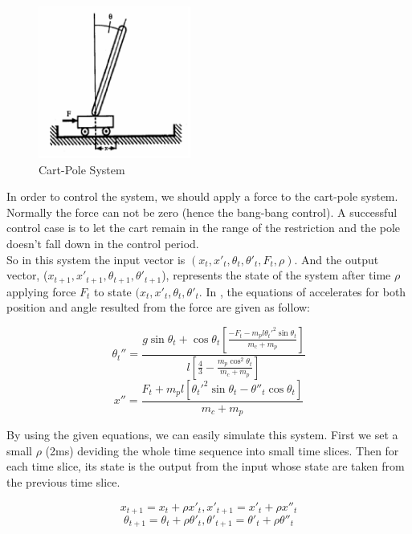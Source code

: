\documentclass[11pt,twoside,a4paper]{article}
\begin{document}
\begin{figure}[!]
\begin{center}
\includegraphics[width=5cm]{cart-pole.png}
\caption{Cart-Pole System\cite{Brownlee2005}}
\label{cart-pole}
\end{center}
\end{figure}

In order to control the system, we should apply a force to the
cart-pole system. Normally the force can not be zero (hence the
bang-bang control). A successful control case is to let the cart
remain in the range of the restriction and the pole doesn't fall down
in the control period.\\

So in this system the input vector is $(x_t, x'_t, \theta_t, \theta '_t, F_t,
\rho)$. And the output vector, ($x_{t+1}, x'_{t+1}, \theta_{t+1},
\theta '_{t+1}$), represents the state of the system after time $\rho$
applying force $F_t$ to state $(x_t, x'_t, \theta_t, \theta '_t$. In
\cite{Brownlee2005}, the equations of accelerates for both position and
angle resulted from the force are given as follow:
\begin{center}
\begin{equation}\label{PH:theta2}
\theta_{t} '' = \frac{g \sin{\theta_t} +
  \cos{\theta_t}[\frac{-F_t-m_p l
    {\theta_t '}^2\sin{\theta_t}}{m_c+m_p}]}{l[\frac{4}{3}-\frac{m_p \cos^2{\theta_t}}{m_c+m_p}]}
\end{equation}
\begin{equation}\label{PH:x2}
x'' = \frac{F_t + m_p l [\theta_t '^2 \sin \theta_t - \theta''_t \cos \theta_t]}{m_c+m_p}
\end{equation}
\end{center}

By using the given equations, we can easily simulate this
system. First we set a small $\rho$ (2ms) deviding the whole time
sequence into small time slices. Then for each time slice, its state
is the output from the input whose state are taken from the previous
time slice.
\begin{center}
\begin{equation}\label{PH:x}
x_{t+1} = x_t + \rho x'_t, x'_{t+1} = x'_t + \rho x''_t
\end{equation}
\begin{equation}\label{PH:theta}
\theta_{t+1} = \theta_t + \rho \theta'_t, \theta'_{t+1} = \theta'_t + \rho \theta''_t
\end{equation}
\end{center}
\end{document}
